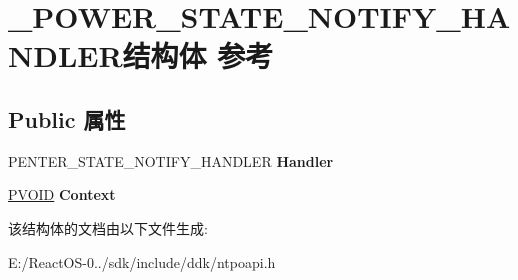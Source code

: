 \hypertarget{struct___p_o_w_e_r___s_t_a_t_e___n_o_t_i_f_y___h_a_n_d_l_e_r}{}\section{\+\_\+\+P\+O\+W\+E\+R\+\_\+\+S\+T\+A\+T\+E\+\_\+\+N\+O\+T\+I\+F\+Y\+\_\+\+H\+A\+N\+D\+L\+E\+R结构体 参考}
\label{struct___p_o_w_e_r___s_t_a_t_e___n_o_t_i_f_y___h_a_n_d_l_e_r}
\subsection*{Public 属性}
\begin{DoxyCompactItemize}
\item 
\mbox{\label{struct___p_o_w_e_r___s_t_a_t_e___n_o_t_i_f_y___h_a_n_d_l_e_r_acdf715514c19d19aa636e8e056b285b6}} 
P\+E\+N\+T\+E\+R\+\_\+\+S\+T\+A\+T\+E\+\_\+\+N\+O\+T\+I\+F\+Y\+\_\+\+H\+A\+N\+D\+L\+ER {\bfseries Handler}
\item 
\mbox{\label{struct___p_o_w_e_r___s_t_a_t_e___n_o_t_i_f_y___h_a_n_d_l_e_r_abdeec4e670c9082c156ccc6984bf9a51}} 
\hyperlink{interfacevoid}{P\+V\+O\+ID} {\bfseries Context}
\end{DoxyCompactItemize}


该结构体的文档由以下文件生成\+:\begin{DoxyCompactItemize}
\item 
E\+:/\+React\+O\+S-\/0../sdk/include/ddk/ntpoapi.\+h\end{DoxyCompactItemize}
